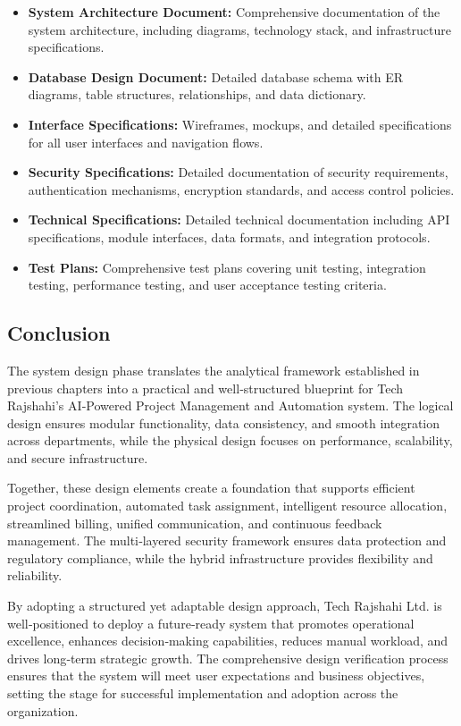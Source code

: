 \documentclass[12pt,a4paper]{article}
\begin{document}
\begin{itemize}
    \item \textbf{System Architecture Document:} Comprehensive documentation of the system architecture, including diagrams, technology stack, and infrastructure specifications.
    
    \item \textbf{Database Design Document:} Detailed database schema with ER diagrams, table structures, relationships, and data dictionary.
    
    \item \textbf{Interface Specifications:} Wireframes, mockups, and detailed specifications for all user interfaces and navigation flows.
    
    \item \textbf{Security Specifications:} Detailed documentation of security requirements, authentication mechanisms, encryption standards, and access control policies.
    
    \item \textbf{Technical Specifications:} Detailed technical documentation including API specifications, module interfaces, data formats, and integration protocols.
    
    \item \textbf{Test Plans:} Comprehensive test plans covering unit testing, integration testing, performance testing, and user acceptance testing criteria.
\end{itemize}

\newpage
\subsection{Conclusion}
The system design phase translates the analytical framework established in previous chapters into a practical and well‑structured blueprint for Tech Rajshahi's AI‑Powered Project Management and Automation system.  The logical design ensures modular functionality, data consistency, and smooth integration across departments, while the physical design focuses on performance, scalability, and secure infrastructure.  

Together, these design elements create a foundation that supports efficient project coordination, automated task assignment, intelligent resource allocation, streamlined billing, unified communication, and continuous feedback management.  The multi‑layered security framework ensures data protection and regulatory compliance, while the hybrid infrastructure provides flexibility and reliability.

By adopting a structured yet adaptable design approach, Tech Rajshahi Ltd. is well‑positioned to deploy a future‑ready system that promotes operational excellence, enhances decision‑making capabilities, reduces manual workload, and drives long‑term strategic growth.  The comprehensive design verification process ensures that the system will meet user expectations and business objectives, setting the stage for successful implementation and adoption across the organization.
\end{document}
